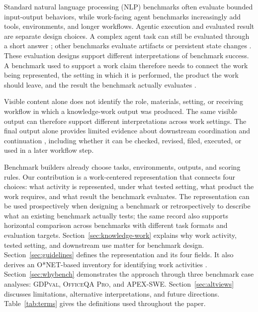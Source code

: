 \documentclass[10pt]{article}
\begin{document}
Standard natural language processing (NLP) benchmarks often evaluate bounded input-output behaviors, while work-facing agent benchmarks increasingly add tools, environments, and longer workflows.
Agentic execution and evaluated result are separate design choices. A complex agent task can still be evaluated through a short answer \citep{browsecomp2024}; other benchmarks evaluate artifacts or persistent state changes \citep{kottamasu2026apex}.
These evaluation designs support different interpretations of benchmark success.
A benchmark used to support a work claim therefore needs to connect the work being represented, the setting in which it is performed, the product the work should leave, and the result the benchmark actually evaluates \citep{jacobs2021measurement,kane2013validating}.

Visible content alone does not identify the role, materials, setting, or receiving workflow in which a knowledge-work output was produced.
The same visible output can therefore support different interpretations across work settings.
The final output alone provides limited evidence about downstream coordination and continuation \citep{carlile2004transferring}, including whether it can be checked, revised, filed, executed, or used in a later workflow step.

Benchmark builders already choose tasks, environments, outputs, and scoring rules. Our contribution is a work-centered representation that connects four choices: what activity is represented, under what tested setting, what product the work requires, and what result the benchmark evaluates. The representation can be used prospectively when designing a benchmark or retrospectively to describe what an existing benchmark actually tests; the same record also supports horizontal comparison across benchmarks with different task formats and evaluation targets.
Section~\ref{sec:knowledge-work} explains why work activity, tested setting, and downstream use matter for benchmark design.
Section~\ref{sec:guidelines} defines the representation and its four fields.
It also derives an O{*}NET-based inventory for identifying work activities \citep{onet2024tasks}.
Section~\ref{sec:whybench} demonstrates the approach through three benchmark case analyses: \textsc{GDPval}, \textsc{OfficeQA Pro}, and \textsc{APEX-SWE}.
Section~\ref{sec:altviews} discusses limitations, alternative interpretations, and future directions.
Table~\ref{tab:terms} gives the definitions used throughout the paper.
\end{document}
